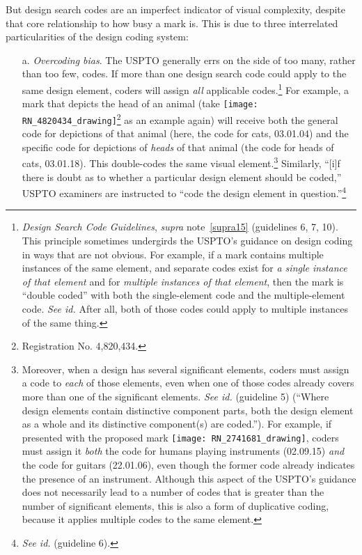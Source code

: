 \documentclass[letterpaper, 11pt, oneside]{article}
\begin{document}
But design search codes are an imperfect indicator of visual complexity, despite that core relationship to how busy a mark is. This is due to three interrelated particularities of the design coding system:

\begin{enumerate}

\item[a.] \textit{Overcoding bias}. The USPTO generally errs on the side of too many, rather than too few, codes. If more than one design search code could apply to the same design element, coders will assign \emph{all} applicable codes.\footnote{\label{supra25} \textit{Design Search Code Guidelines}, \textit{supra} note~\ref{supra15} (guidelines 6, 7, 10). This principle sometimes undergirds the USPTO's guidance on design coding in ways that are not obvious. For example, if a mark contains multiple instances of the same element, and separate codes exist for \emph{a single instance of that element} and for \emph{multiple instances of that element}, then the mark is ``double coded'' with both the single-element code and the multiple-element code. \textit{See id.} After all, both of those codes could apply to multiple instances of the same thing.} For example, a mark that depicts the head of an animal (take \texttt{[image: RN\_4820434\_drawing]}\footnote{Registration No. 4,820,434.} as an example again) will receive both the general code for depictions of that animal (here, the code for cats, 03.01.04) and the specific code for depictions of \emph{heads} of that animal (the code for heads of cats, 03.01.18). This double-codes the same visual element.\footnote{Moreover, when a design has several significant elements, coders must assign a code to \emph{each} of those elements, even when one of those codes already covers more than one of the significant elements. \textit{See id.} (guideline 5) (``Where design elements contain distinctive component parts, both the design element as a whole and its distinctive component(s) are coded.''). For example, if presented with the proposed mark \texttt{[image: RN\_2741681\_drawing]}, coders must assign it \emph{both} the code for humans playing instruments (02.09.15) \emph{and} the code for guitars (22.01.06), even though the former code already indicates the presence of an instrument. Although this aspect of the USPTO's guidance does not necessarily lead to a number of codes that is greater than the number of significant elements, this is also a form of duplicative coding, because it applies multiple codes to the same element.} Similarly, ``[i]f there is doubt as to whether a particular design element should be coded,'' USPTO examiners are instructed to ``code the design element in question.''\footnote{\textit{See id.} (guideline 6).}


\end{enumerate}
\end{document}
